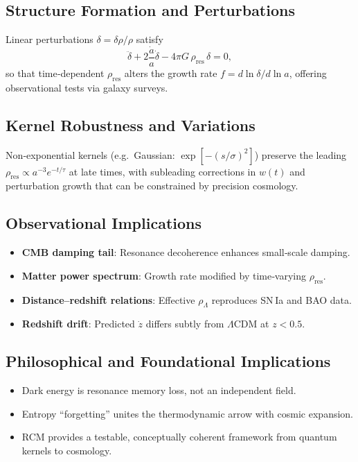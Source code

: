 \subsection{Structure Formation and Perturbations}

Linear perturbations \(\delta=\delta\rho/\rho\) satisfy
\[
\ddot\delta + 2\frac{\dot a}{a}\dot\delta
- 4\pi G\,\rho_{\mathrm{res}}\,\delta = 0,
\]
so that time‐dependent \(\rho_{\mathrm{res}}\) alters the growth rate \(f=d\ln\delta/d\ln a\), offering observational tests via galaxy surveys.

\subsection{Kernel Robustness and Variations}

Non‐exponential kernels (e.g.\ Gaussian: \(\exp[-(s/\sigma)^2]\)) preserve the leading \(\rho_{\mathrm{res}}\propto a^{-3}e^{-t/\tau}\) at late times, with subleading corrections in \(w(t)\) and perturbation growth that can be constrained by precision cosmology.

\subsection{Observational Implications}

\begin{itemize}
  \item \textbf{CMB damping tail}: Resonance decoherence enhances small‐scale damping.  
  \item \textbf{Matter power spectrum}: Growth rate modified by time‐varying \(\rho_{\mathrm{res}}\).  
  \item \textbf{Distance–redshift relations}: Effective \(\rho_\Lambda\) reproduces SN Ia and BAO data.  
  \item \textbf{Redshift drift}: Predicted \(\dot z\) differs subtly from \(\Lambda\)CDM at \(z<0.5\).  
\end{itemize}

\subsection{Philosophical and Foundational Implications}

\begin{itemize}
  \item Dark energy is resonance memory loss, not an independent field.  
  \item Entropy “forgetting” unites the thermodynamic arrow with cosmic expansion.  
  \item RCM provides a testable, conceptually coherent framework from quantum kernels to cosmology.  
\end{itemize}

